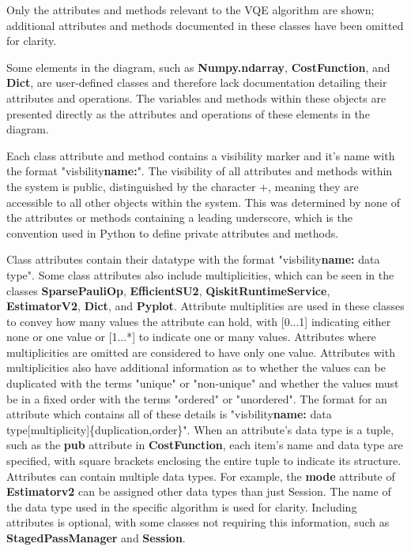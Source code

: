 \documentclass{article}
\begin{document}
{Only the attributes and methods relevant to the VQE algorithm are shown; additional attributes and methods documented in these classes have been omitted for clarity.

Some elements in the diagram, such as \textbf{Numpy.ndarray}, \textbf{CostFunction}, and \textbf{Dict}, are user-defined classes and therefore lack documentation detailing their attributes and operations. The variables and methods within these objects are presented directly as the attributes and operations of these elements in the diagram.

Each class attribute and method contains a visibility marker and it's name with the format "visbility\textbf{name:}". The visibility of all attributes and methods within the system is public, distinguished by the character +, meaning they are accessible to all other objects within the system\cite{Seidl_Scholz_Huemer_Kappel_Duffy_2014}. This was determined by none of the attributes or methods containing a leading underscore, which is the convention used in Python to define private attributes and methods\cite{Privacy}.

Class attributes contain their datatype with the format "visbility\textbf{name:} data type". Some class attributes also include multiplicities, which can be seen in the classes \textbf{SparsePauliOp}, \textbf{EfficientSU2}, \textbf{QiskitRuntimeService}, \textbf{EstimatorV2}, \textbf{Dict}, and \textbf{Pyplot}. Attribute multiplities are used in these classes to convey how many values the attribute can hold\cite{Seidl_Scholz_Huemer_Kappel_Duffy_2014}, with [0...1] indicating either none or one value or [1...*] to indicate one or many values. Attributes where multiplicities are omitted are considered to have only one value. Attributes with multiplicities also have additional information as to whether the values can be duplicated with the terms "unique" or "non-unique" and whether the values must be in a fixed order with the terms "ordered" or "unordered"\cite{Seidl_Scholz_Huemer_Kappel_Duffy_2014}. The format for an attribute which contains all of these details is "visbility\textbf{name:} data type[multiplicity]\{duplication,order\}". When an attribute's data type is a tuple, such as the \textbf{pub} attribute in \textbf{CostFunction}, each item's name and data type are specified, with square brackets enclosing the entire tuple to indicate its structure. Attributes can contain multiple data types. For example, the \textbf{mode} attribute of \textbf{Estimatorv2} can be assigned other data types than just Session. The name of the data type used in the specific algorithm is used for clarity. Including attributes is optional, with some classes not requiring this information, such as \textbf{StagedPassManager} and \textbf{Session}. 

}
\end{document}
